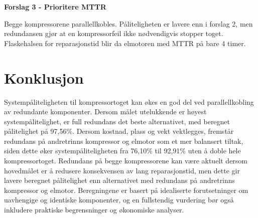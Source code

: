 \textbf{\large Forslag 3 - Prioritere MTTR}

Begge kompressorene parallellkobles. Påliteligheten er lavere enn i forslag 2, men redundansen gjør at en kompressorfeil ikke nødvendigvis stopper toget. Flaskehalsen for reparasjonstid blir da elmotoren med MTTR på bare 4 timer.

\section{Konklusjon}

Systempåliteligheten til kompressortoget kan økes en god del ved parallellkobling av redundante komponenter. Dersom målet utelukkende er høyest systempålitelighet, er full redundans det beste alternativet, med beregnet pålitelighet på 97{,}56\%. Dersom kostnad, plass og vekt vektlegges, fremstår redundans på andretrinns kompressor og elmotor som et mer balansert tiltak, siden dette øker systempåliteligheten fra 76{,}10\% til 92{,}91\% uten å doble hele kompressortoget. Redundans på begge kompressorene kan være aktuelt dersom hovedmålet er å redusere konsekvensen av lang reparasjonstid, men dette gir lavere beregnet pålitelighet enn alternativet med redundans på andretrinns kompressor og elmotor. Beregningene er basert på idealiserte forutsetninger om uavhengige og identiske komponenter, og en fullstendig vurdering bør også inkludere praktiske begrensninger og økonomiske analyser.

